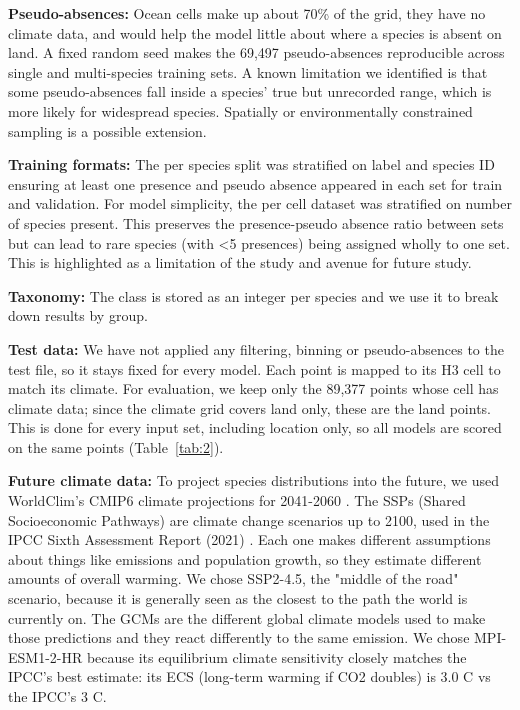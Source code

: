 \documentclass{article}
\begin{document}
\textbf{Pseudo-absences:} Ocean cells make up about 70\% of the grid, they have no climate data, and would help the model little about where a species is absent on land. A fixed random seed makes the 69,497 pseudo-absences reproducible across single and multi-species training sets. A known limitation we identified is that some pseudo-absences fall inside a species' true but unrecorded range, which is more likely for widespread species. Spatially or environmentally constrained sampling \cite{11345587} is a possible extension. 

\textbf{Training formats:} The per species split was stratified on label and species ID ensuring at least one presence and pseudo absence appeared in each set for train and validation. For model simplicity, the per cell dataset was stratified on number of species present. This preserves the presence-pseudo absence ratio between sets but can lead to rare species (with <5 presences) being assigned wholly to one set. This is highlighted as a limitation of the study and avenue for future study.

\textbf{Taxonomy:} The class is stored as an integer per species and we use it to break down results by group.

\textbf{Test data:} We have not applied any filtering, binning or pseudo-absences to the test file, so it stays fixed for every model. Each point is mapped to its H3 cell to match its climate. For evaluation, we keep only the 89,377 points whose cell has climate data; since the climate grid covers land only, these are the land points. This is done for every input set, including location only, so all models are scored on the same points (Table~\ref{tab:2}).

\textbf{Future climate data:} To project species distributions into the future, we used WorldClim's CMIP6 climate projections for 2041-2060 \cite{fick2017worldclim}. The SSPs (Shared Socioeconomic Pathways) are climate change scenarios up to 2100, used in the IPCC Sixth Assessment Report (2021) \cite{allan2023intergovernmental}. Each one makes different assumptions about things like emissions and population growth, so they estimate different amounts of overall warming. We chose SSP2-4.5, the "middle of the road" scenario, because it is generally seen as the closest to the path the world is currently on. The GCMs are the different global climate models used to make those predictions and they react differently to the same emission. We chose MPI-ESM1-2-HR because its equilibrium climate sensitivity closely matches the IPCC's best estimate: its ECS (long-term warming if CO2 doubles) is 3.0 C \cite{meehl2020context} vs the IPCC's 3 C.
\end{document}
